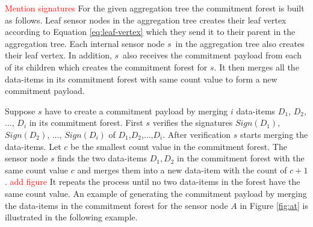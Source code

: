 	\newpage
	\textcolor{red}{Mention signatures}
	For the given aggregation tree the commitment forest is built as follows.
	Leaf sensor nodes in the aggregation tree creates their leaf vertex according to Equation \ref{eq:leaf-vertex} which they send it to their parent in the aggregation tree.
	Each internal sensor node $s$\ in the aggregation tree also creates their leaf vertex.
	In addition, $s$\ also receives the commitment payload from each of its children which creates the commitment forest for $s$.
	It then merges all the data-items in its commitment forest with same count value to form a new commitment payload.

	Suppose $s$ have to create a commitment payload by merging $i$ data-items $D_{1}$, $D_{2}$, $\dotsc$, $D_{i}$ in its commitment forest.
	First $s$ verifies the signatures $Sign(D_{1})$, $Sign(D_{2})$, $\dotsc$, $Sign(D_{i})$ of $D_{1}$,$D_{2}$,$\dotsc$,$D_{i}$.
	After verification $s$ starts merging the data-items.
	Let $c$ be the smallest count value in the commitment forest.
	The sensor node $s$ finds the two data-items $D_{1},D_{2}$ in the commitment forest with the same count value $c$ and merges them into a new data-item with the count of $c+1$.
	\textcolor{red}{add figure}
	It repeats the process until no two data-items in the forest have the same count value.
	An example of generating the commitment payload by merging the data-items in the commitment forest for the sensor node $A$ in Figure \ref{fig:at} is illustrated in the following example.
